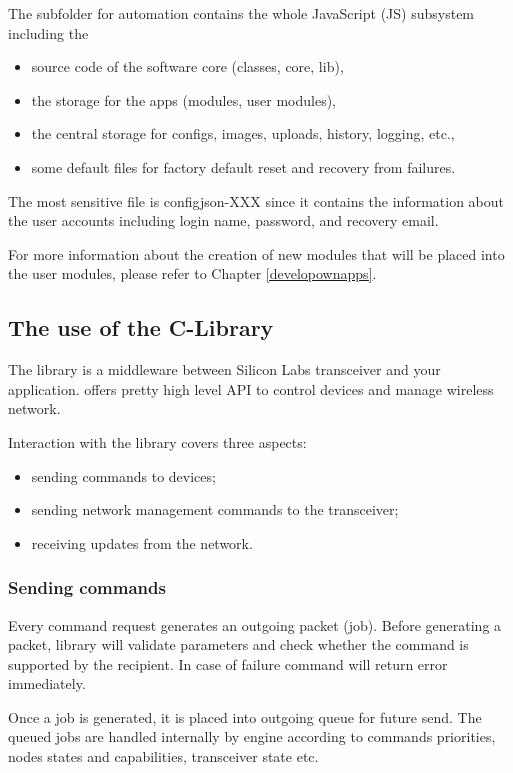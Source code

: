 The subfolder for automation contains the whole JavaScript (JS) subsystem including the
\begin{itemize}
\item source code of the software core (classes, core, lib),
\item the storage for the apps (modules, user modules),
\item the central storage for configs, images, uploads, history, logging, etc.,
\item some default files for factory default reset and recovery from failures.
\end{itemize}

The most sensitive file is configjson-XXX since it contains the information about the user 
accounts including login name, password, and recovery email.

For more information about the creation of new modules that will be placed into the user 
modules, please refer to Chapter \ref{developownapps}.

\subsection{The use of  the C-Library}


The \zway library is a middleware between Silicon Labs \zwave transceiver and your application. 
\zway offers pretty high level API to control \zwave devices and manage wireless network.

Interaction with the library covers three aspects:
\begin{itemize}
\item sending commands to \zwave devices;
\item sending network management commands to the transceiver;
\item receiving updates from the network.
\end{itemize}

\subsubsection{Sending commands}

Every command request generates an outgoing packet (job). Before generating a packet, 
library will validate parameters and check whether the command is supported by the recipient. 
In case of failure command will return error immediately.

Once a job is generated, it is placed into outgoing queue for future send. The queued jobs 
are handled internally by \zway engine according to commands priorities, nodes states 
and capabilities, transceiver state etc.

